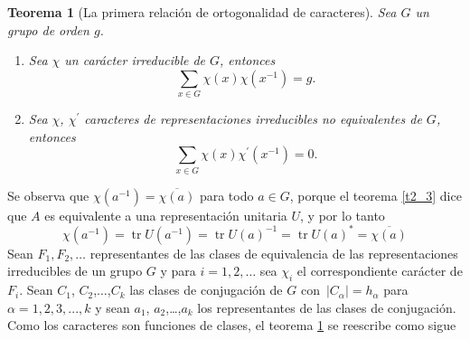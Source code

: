 \documentclass[12pt]{book}
\DeclareMathOperator{\tr}{tr}
\newtheorem{theorem}{Teorema}[section]
\theoremstyle{definition}
\newcounter{in}
\begin{document}
\begin{theorem}[La primera relación de ortogonalidad de caracteres]
  \label{t4_4}
  Sea $G$ un grupo de orden $g$.
  \begin{enumerate}
  \item Sea $\chi$ un carácter irreducible de $G$, entonces 
  \begin{equation*}
    \sum_{x \in G} \chi(x) \chi(x^{-1}) = g.
  \end{equation*}
  \item Sea $\chi$, $\chi^{'}$ caracteres de representaciones
    irreducibles no equivalentes de $G$, entonces
  \begin{equation*}
    \sum_{x \in G} \chi(x) \chi^{'}(x^{-1}) = 0.
  \end{equation*}
  \end{enumerate}
\end{theorem}
Se observa que $\chi(a^{-1})=\overline{\chi(a)}$ para todo $a \in G$,
porque el teorema \ref{t2_3} dice que $A$ es equivalente a una
representación unitaria $U$, y por lo tanto
\begin{equation}
  \label{eq:34}
  \chi(a^{-1})=\tr U(a^{-1})=\tr U(a)^{-1}=\tr U(a)^{*} = \overline{\chi(a)}  
\end{equation}
Sean $F_{1}, F_{2}, \ldots$ representantes de las clases de
equivalencia de las representaciones irreducibles de un grupo $G$ y
para $i=1,2, \ldots$ sea $\chi_{i}$ el correspondiente carácter
de $F_{i}$.  Sean $C_{1}$, $C_{2}$,...,$C_{k}$ las
clases de conjugación de $G$ con~$|C_{\alpha}|=h_{\alpha}$
para $\alpha=1, 2, 3,...,k$ y sean $a_{1}$, $a_{2}$,\ldots,$a_{k}$ los
representantes de las clases de conjugación. Como los caracteres son
funciones de clases, el teorema \ref{t4_4} se reescribe como sigue
\end{document}
